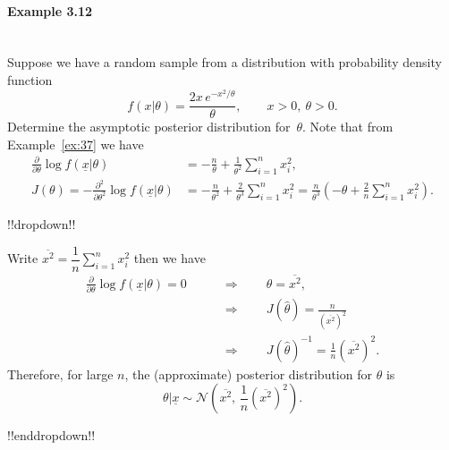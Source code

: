 \paragraph{Example 3.12}{~\\
Suppose we have a random sample from a distribution with probability density function
\begin{equation*}
f(x|\theta)=\frac{2x\,e^{-x^2/\theta}}{\theta},\quad\quad x>0,~\theta>0.
\end{equation*}
Determine the asymptotic posterior distribution for~$\theta$. Note that from Example~\ref{ex:37} we have 
\begin{align*}
\frac{\partial}{\partial\theta} \log
f(\underline{x}|\theta)&=-\frac{n}{\theta}+\frac{1}{\theta^2}\sum_{i=1}^n
x_i^2, \\
J(\theta)=-\frac{\partial^2}{\partial\theta^2} \log
f(\underline{x}|\theta)&=-\frac{n}{\theta^2} +\frac{2}{\theta^3}\sum_{i=1}^n
x_i^2 =\frac{n}{\theta^3}\left(-\theta+\frac{2}{n}\sum_{i=1}^n
x_i^2\right).
\end{align*}

!!dropdown!!

Write $\overline{x^2}=\dfrac{1}{n}\displaystyle\sum_{i=1}^n x_i^2$ then we have
    \begin{align*}
    \frac{\partial}{\partial\theta} \log f(\underline{x}|\theta)=0
    \quad\quad&\Longrightarrow\quad\quad
    \hat\theta=\overline{x^2}, \\
    &\Longrightarrow\quad\quad
    J(\hat\theta)=\frac{n}{\left(\overline{x^2}\right)^2} \\
    &\Longrightarrow\quad\quad
    J(\hat\theta)^{-1}=\frac{1}{n}\left(\overline{x^2}\right)^2.
    \end{align*}
    Therefore, for large $n$, the (approximate) posterior distribution for
    $\theta$ is
    $$
    \theta|\underline{x}\sim \mathcal{N}\left(\overline{x^2},\,
    \frac{1}{n}\left(\overline{x^2}\right)^2\right).
    $$

!!enddropdown!!}



